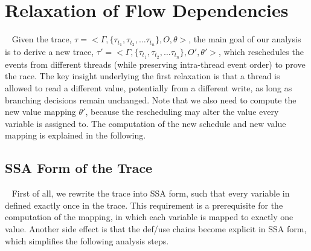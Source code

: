 \section{Relaxation of Flow Dependencies}~\label{sec:relax1}
Given the trace, $\tau=<\Gamma , \{\tau_{t_1}, \tau_{t_2}, \dots \tau_{t_n} \}, O, \theta>$, the main goal of our analysis is to derive a new trace,  $\tau'=<\Gamma , \{\tau_{t_1}, \tau_{t_2}, \dots \tau_{t_n} \}, O', \theta'>$, which reschedules the events from different threads (while preserving intra-thread event order) to prove the race. The key insight underlying the first relaxation is that a thread is allowed to read a different value, potentially from a different write, as long as branching decisions remain unchanged.
Note that we also need to compute the new value mapping $\theta'$, because the rescheduling may alter the value every variable is assigned to. The computation of the new schedule and new value mapping is explained in the following.







\subsection{SSA Form of the Trace}~\label{sec:ssa}
First of all, we rewrite the trace into SSA form, such that every variable in defined exactly once in the trace. This requirement is a prerequisite for the computation of the mapping, in which each variable is mapped to exactly one value. Another side effect is that the def/use chains become explicit in  SSA form, which simplifies the following analysis steps.

